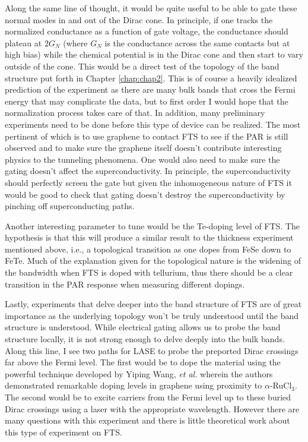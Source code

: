 Along the same line of thought, it would be quite useful to be able to gate these normal modes in and out of the Dirac cone. In principle, if one tracks the normalized conductance as a function of gate voltage, the conductance should plateau at $2G_{N}$ (where $G_{N}$ is the conductance across the same contacts but at high bias) while the chemical potential is in the Dirac cone and then start to vary outside of the cone. This would be a direct test of the topology of the band structure put forth in Chapter \ref{chap:chap2}. This is of course a heavily idealized prediction of the experiment as there are many bulk bands that cross the Fermi energy that may complicate the data, but to first order I would hope that the normalization process takes care of that. In addition, many preliminary experiments need to be done before this type of device can be realized. The most pertinent of which is to use graphene to contact \ac{FTS} to see if the \ac{PAR} is still observed and to make sure the graphene itself doesn't contribute interesting physics to the tunneling phenomena. One would also need to make sure the gating doesn't affect the superconductivity. In principle, the superconductivity should perfectly screen the gate but given the inhomogeneous nature of \ac{FTS} it would be good to check that gating doesn't destroy the superconductivity by pinching off superconducting paths.\par
Another interesting parameter to tune would be the Te-doping level of \ac{FTS}. The hypothesis is that this will produce a similar result to the thickness experiment mentioned above, i.e., a topological transition as one dopes from FeSe down to FeTe. Much of the explanation given for the topological nature is the widening of the bandwidth when FTS is doped with tellurium, thus there should be a clear transition in the \ac{PAR} response when measuring different dopings.\par
Lastly, experiments that delve deeper into the band structure of \ac{FTS} are of great importance as the underlying topology won't be truly understood until the band structure is understood. While electrical gating allows us to probe the band structure locally, it is not strong enough to delve deeply into the bulk bands. Along this line, I see two paths for LASE to probe the preported Dirac crossings far above the Fermi level. The first would be to dope the material using the powerful technique developed by Yiping Wang, \textit{et al.} wherein the authors demonstrated remarkable doping levels in graphene using proximity to $\alpha$-RuCl$_{3}$\cite{WangBalgley2020}. The second would be to excite carriers from the Fermi level up to these buried Dirac crossings using a laser with the appropriate wavelength. However there are many questions with this experiment and there is little theoretical work about this type of experiment on \ac{FTS}.
